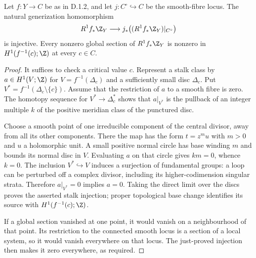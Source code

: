 \begin{lemma}[D.1.8; Proved]\label{st:D.1.8}
Let $f:Y\to C$ be as in D.1.2, and let $j:C^\circ\hookrightarrow C$
be the smooth-fibre locus. The natural generization homomorphism
\[
R^1f_*\Z_Y\longrightarrow
j_*\bigl((R^1f_*\Z_Y)|_{C^\circ}\bigr)
\]
is injective. Every nonzero global section of $R^1f_*\Z_Y$ is
nonzero in $H^1(f^{-1}(c);\Z)$ at every $c\in C$.
\end{lemma}
\begin{proof}
It suffices to check a critical value $c$. Represent a stalk class
by $a\in H^1(V;\Z)$ for $V=f^{-1}(\Delta_c)$ and a sufficiently
small disc $\Delta_c$. Put $V^*=f^{-1}(\Delta_c\setminus\{c\})$.
Assume that the restriction of $a$ to a smooth fibre is zero.
The homotopy sequence for $V^*\to\Delta_c^*$ shows that
$a|_{V^*}$ is the pullback of an integer multiple $k$ of the
positive meridian class of the punctured disc.

Choose a smooth point of one irreducible component of the central
divisor, away from all its other components. There the map has
the form $t=z^m u$ with $m>0$ and $u$ a holomorphic unit.
A small positive normal circle has base winding $m$ and bounds
its normal disc in $V$. Evaluating $a$ on that circle gives
$km=0$, whence $k=0$.
The inclusion $V^*\hookrightarrow V$ induces a surjection of
fundamental groups: a loop can be perturbed off a complex divisor,
including its higher-codimension singular strata. Therefore
$a|_{V^*}=0$ implies $a=0$.
Taking the direct limit over the discs proves the asserted stalk
injection; proper topological base change identifies its source
with $H^1(f^{-1}(c);\Z)$.

If a global section vanished at one point, it would vanish on a
neighbourhood of that point. Its restriction to the connected
smooth locus is a section of a local system, so it would vanish
everywhere on that locus. The just-proved injection then makes
it zero everywhere, as required.
\end{proof}

